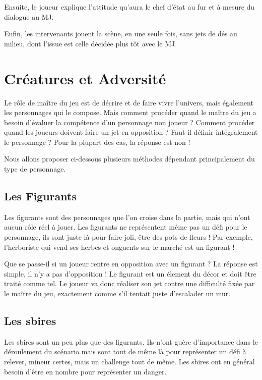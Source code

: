 \begin{multicols}{2}
Ensuite, le joueur explique l'attitude qu'aura le chef d'état au fur et à mesure du dialogue au MJ.

Enfin, les intervenants jouent la scène, en une seule fois, sans jets de dés au milieu, dont l'issue est celle décidée plus tôt avec le MJ.

\section{Créatures et Adversité}

Le rôle de maître du jeu est de décrire et de faire vivre l'univers, mais également les personnages qui le compose. Mais comment procéder quand le maître du jeu a besoin d'évaluer la compétence d'un personnage non joueur ? Comment procéder quand les joueurs doivent faire un jet en opposition ? Faut-il définir intégralement le personnage ? Pour la plupart des cas, la réponse est non ! 

Nous allons proposer ci-dessous plusieurs méthodes dépendant principalement du type de personnage.

\subsection{Les Figurants}

Les figurants sont des personnages que l'on croise dans la partie, mais qui n'ont aucun rôle réel à jouer. Les figurants ne représentent même pas un défi pour le personnage, ils sont juste là pour faire joli, être des pots de fleurs ! Par exemple, l'herboriste qui vend ses herbes et onguents sur le marché est un figurant !

Que se passe-il si un joueur rentre en opposition avec un figurant ? La réponse est simple, il n'y a pas d'opposition ! Le figurant est un élement du décor et doit être traité comme tel. Le joueur va donc réaliser son jet contre une difficulté fixée par le maître du jeu, exactement comme s'il tentait juste d'escalader un mur.

\subsection{Les sbires}

Les sbires sont un peu plus que des figurants. Ils n'ont guère d'importance dans le déroulement du scénario mais sont tout de même là pour représenter un défi à relever, mineur certes, mais un challenge tout de même. Les sbires ont en général besoin d'être en nombre pour représenter un danger.


\end{multicols}
